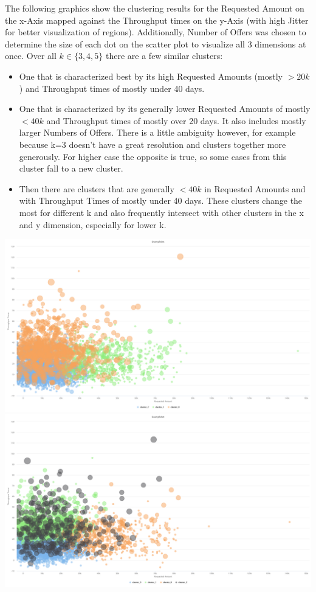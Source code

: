 \documentclass[../../main.tex]{subfiles}
\begin{document}
The following graphics show the clustering results for the Requested Amount on the x-Axis mapped against the Throughput times on the y-Axis (with high Jitter for better visualization of regions). Additionally, Number of Offers was chosen to determine the size of each dot on the scatter plot to visualize all 3 dimensions at once. Over all $k\in\{3,4,5\}$ there are a few similar clusters:
\begin{itemize}
\item One that is characterized best by its high Requested Amounts (mostly $>20k$) and Throughput times of mostly under 40 days.
\item One that is characterized by its generally lower Requested Amounts of mostly $<40k$ and Throughput times of mostly over 20 days. It also includes mostly larger Numbers of Offers. There is a little ambiguity however, for example because k=3 doesn't have a great resolution and clusters together more generously. For higher case the opposite is true, so some cases from this cluster fall to a new cluster.
\item Then there are clusters that are generally $<40k$ in Requested Amounts and with Throughput Times of mostly under 40 days. These clusters change the most for different k and also frequently intersect with other clusters in the x and y dimension, especially for lower k.\\
\end{itemize}
\includegraphics[width=\textwidth]{img/QUESTION_3a_kmeans_3_offers_amount.png}
\includegraphics[width=\textwidth]{img/QUESTION_3a_kmeans_4_offers_amount.png}
\end{document}
